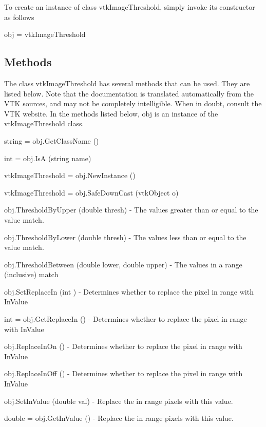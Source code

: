 To create an instance of class vtk\-Image\-Threshold, simply invoke its constructor as follows \begin{DoxyVerb}  obj = vtkImageThreshold
\end{DoxyVerb}
 \hypertarget{vtkwidgets_vtkxyplotwidget_Methods}{}\subsection{Methods}\label{vtkwidgets_vtkxyplotwidget_Methods}
The class vtk\-Image\-Threshold has several methods that can be used. They are listed below. Note that the documentation is translated automatically from the V\-T\-K sources, and may not be completely intelligible. When in doubt, consult the V\-T\-K website. In the methods listed below, {\ttfamily obj} is an instance of the vtk\-Image\-Threshold class. 
\begin{DoxyItemize}
\item {\ttfamily string = obj.\-Get\-Class\-Name ()}  
\item {\ttfamily int = obj.\-Is\-A (string name)}  
\item {\ttfamily vtk\-Image\-Threshold = obj.\-New\-Instance ()}  
\item {\ttfamily vtk\-Image\-Threshold = obj.\-Safe\-Down\-Cast (vtk\-Object o)}  
\item {\ttfamily obj.\-Threshold\-By\-Upper (double thresh)} -\/ The values greater than or equal to the value match.  
\item {\ttfamily obj.\-Threshold\-By\-Lower (double thresh)} -\/ The values less than or equal to the value match.  
\item {\ttfamily obj.\-Threshold\-Between (double lower, double upper)} -\/ The values in a range (inclusive) match  
\item {\ttfamily obj.\-Set\-Replace\-In (int )} -\/ Determines whether to replace the pixel in range with In\-Value  
\item {\ttfamily int = obj.\-Get\-Replace\-In ()} -\/ Determines whether to replace the pixel in range with In\-Value  
\item {\ttfamily obj.\-Replace\-In\-On ()} -\/ Determines whether to replace the pixel in range with In\-Value  
\item {\ttfamily obj.\-Replace\-In\-Off ()} -\/ Determines whether to replace the pixel in range with In\-Value  
\item {\ttfamily obj.\-Set\-In\-Value (double val)} -\/ Replace the in range pixels with this value.  
\item {\ttfamily double = obj.\-Get\-In\-Value ()} -\/ Replace the in range pixels with this value.  

\end{DoxyItemize}

